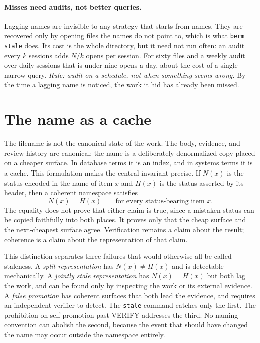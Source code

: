 \documentclass[11pt]{article}
\newcommand{\st}[1]{\textsf{#1}}
\begin{document}
\paragraph{Misses need audits, not better queries.} Lagging names are invisible to any strategy that starts from names. They are recovered only by opening files the names do not point to, which is what \texttt{berm stale} does. Its cost is the whole directory, but it need not run often: an audit every $k$ sessions adds $N/k$ opens per session. For sixty files and a weekly audit over daily sessions that is under nine opens a day, about the cost of a single narrow query. \emph{Rule: audit on a schedule, not when something seems wrong.} By the time a lagging name is noticed, the work it hid has already been missed.
\section{The name as a cache}\label{sec:cache}

The filename is not the canonical state of the work. The body, evidence, and review history are canonical; the name is a deliberately denormalized copy placed on a cheaper surface. In database terms it is an index, and in systems terms it is a cache. This formulation makes the central invariant precise. If $N(x)$ is the status encoded in the name of item $x$ and $H(x)$ is the status asserted by its header, then a coherent namespace satisfies
\[
                         N(x)=H(x)\qquad\text{for every status-bearing item }x.
\]
The equality does not prove that either claim is true, since a mistaken status can be copied faithfully into both places. It proves only that the cheap surface and the next-cheapest surface agree. Verification remains a claim about the result; coherence is a claim about the representation of that claim.

This distinction separates three failures that would otherwise all be called staleness. A \emph{split representation} has $N(x)\ne H(x)$ and is detectable mechanically. A \emph{jointly stale representation} has $N(x)=H(x)$ but both lag the work, and can be found only by inspecting the work or its external evidence. A \emph{false promotion} has coherent surfaces that both lead the evidence, and requires an independent verifier to detect. The \texttt{stale} command catches only the first. The prohibition on self-promotion past \st{VERIFY} addresses the third. No naming convention can abolish the second, because the event that should have changed the name may occur outside the namespace entirely.
\end{document}
